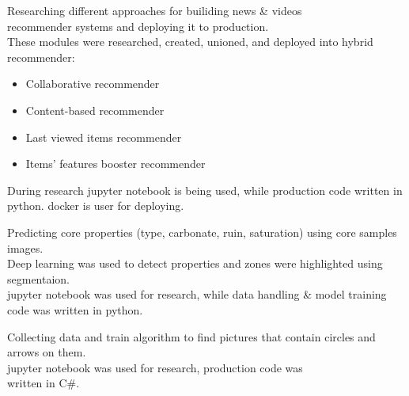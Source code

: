 \documentclass[
	a4paper,
]{fortysecondscv}
\begin{document}
\par
\makefrontsidebar{}

\begin{cvtable}[1.5]

    {Researching different approaches for builiding news \& videos \\ 
        recommender systems and deploying it to production. \\
     These modules were researched, created, unioned, and deployed into hybrid recommender:
            \begin{itemize}
                \setlength\itemsep{0.01em}
                \item Collaborative recommender
                \item Content-based recommender
                \item Last viewed items recommender
                \item Items' features booster recommender
            \end{itemize}
     During research \colorbox{cvsidecolor}{jupyter notebook} is being used,
       while production code written in \colorbox{cvsidecolor}{python}.
       \colorbox{cvsidecolor}{docker} is user for deploying.
    }

\end{cvtable}

\begin{cvtable}[1.5]

	{Predicting core properties (type, carbonate, ruin, saturation)
		using core samples images. \\
     Deep learning was used to detect properties and zones
        were highlighted using segmentaion. \\
     \colorbox{cvsidecolor}{jupyter notebook} was used for research,
        while data handling \& model training code was written in \colorbox{cvsidecolor}{python}.
    }

	{Collecting data and train algorithm to find pictures that
		contain circles and arrows on them. \\
     \colorbox{cvsidecolor}{jupyter notebook} was used for research,
        production code was \\ written in \colorbox{cvsidecolor}{C\#}.
    }

\end{cvtable}
\end{document}
